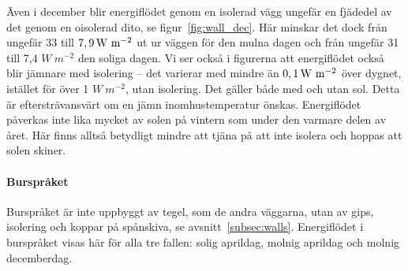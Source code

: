 Även i december blir energiflödet genom en isolerad vägg ungefär en fjädedel av det 
genom en oisolerad dito, se figur~\ref{fig:wall_dec}. Här minskar det dock från ungefär 33 
till $\unit[7,9]{W~m^{-2}}$ ut ur väggen för den mulna dagen och från ungefär 31 till 7,4 $\unit{W~m^{-2}}$ den soliga dagen. Vi ser också i figurerna att energiflödet också blir 
jämnare med isolering – det varierar med mindre än $\unit[0,1]{W~m^{-2}}$ över dygnet, 
istället för över 1 $\unit{W~m^{-2}}$, utan isolering. Det gäller både med och utan sol. Detta är eftersträvansvärt om en jämn inomhustemperatur önskas. Energiflödet påverkas inte lika mycket av solen på vintern som under den varmare delen av året. Här finns alltså betydligt mindre att tjäna på att inte isolera och hoppas att solen skiner.

\paragraph{Burspråket}

Burspråket är inte uppbyggt av tegel, som de andra väggarna, utan av gips, isolering och koppar på spånskiva, se avsnitt~\ref{subsec:walls}. Energiflödet i burspråket visas här för alla tre fallen: solig aprildag, molnig aprildag och molnig decemberdag.

